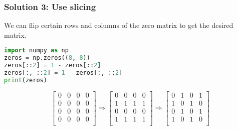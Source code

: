 \documentclass[beamer, en, version=2.0]{huangfusl-template}
\begin{document}
    \begin{frame}[fragile]
        \frametitle{Solution 3: Use slicing}

        We can flip certain rows and columns of the zero matrix to get the desired matrix.

\begin{lstlisting}[language=python]
import numpy as np
zeros = np.zeros((8, 8))
zeros[::2] = 1 - zeros[::2]
zeros[:, ::2] = 1 - zeros[:, ::2]
print(zeros)
\end{lstlisting}
        \begin{equation*}
            \begin{bmatrix}
                0 & 0 & 0 & 0 \\
                0 & 0 & 0 & 0 \\
                0 & 0 & 0 & 0 \\
                0 & 0 & 0 & 0 \\
            \end{bmatrix} \Longrightarrow \begin{bmatrix}
                0 & 0 & 0 & 0 \\
                1 & 1 & 1 & 1 \\
                0 & 0 & 0 & 0 \\
                1 & 1 & 1 & 1 \\
            \end{bmatrix} \Longrightarrow \begin{bmatrix}
                0 & 1 & 0 & 1 \\
                1 & 0 & 1 & 0 \\
                0 & 1 & 0 & 1 \\
                1 & 0 & 1 & 0 \\
            \end{bmatrix}
        \end{equation*}
    \end{frame}
\end{document}
